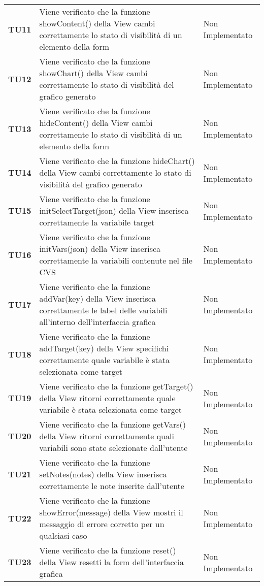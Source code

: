 \documentclass[../piano-di-qualifica.tex]{subfiles}
\begin{document}
\begin{longtable}[H]{>{\centering\bfseries}m{2.5cm} >{\centering}m{7.5cm} >{\centering\arraybackslash}m{3.5cm}}
  \textbf{TU11} & Viene verificato che la funzione showContent() della View cambi correttamente lo stato di visibilità di un elemento della form & Non Implementato \\
  \textbf{TU12} & Viene verificato che la funzione showChart() della View cambi correttamente lo stato di visibilità del grafico generato & Non Implementato \\
  \textbf{TU13} & Viene verificato che la funzione hideContent() della View cambi correttamente lo stato di visibilità di un elemento della form & Non Implementato \\
  \textbf{TU14} & Viene verificato che la funzione hideChart() della View cambi correttamente lo stato di visibilità del grafico generato & Non Implementato \\
  \textbf{TU15} & Viene verificato che la funzione initSelectTarget(json) della View inserisca correttamente la variabile target & Non Implementato \\
  \textbf{TU16} & Viene verificato che la funzione initVars(json) della View inserisca correttamente la variabili contenute nel file CVS & Non Implementato \\
  \textbf{TU17} & Viene verificato che la funzione addVar(key) della View inserisca correttamente le label delle variabili all'interno dell'interfaccia grafica & Non Implementato \\
  \textbf{TU18} & Viene verificato che la funzione addTarget(key) della View specifichi correttamente quale variabile è stata selezionata come target & Non Implementato \\
  \textbf{TU19} & Viene verificato che la funzione getTarget() della View ritorni correttamente quale variabile è stata selezionata come target & Non Implementato \\
  \textbf{TU20} & Viene verificato che la funzione getVars() della View ritorni correttamente quali variabili sono state selezionate dall'utente & Non Implementato \\
  \textbf{TU21} & Viene verificato che la funzione setNotes(notes) della View inserisca correttamente le note inserite dall'utente & Non Implementato \\
  \textbf{TU22} & Viene verificato che la funzione showError(message) della View mostri il messaggio di errore corretto per un qualsiasi caso & Non Implementato \\
  \textbf{TU23} & Viene verificato che la funzione reset() della View resetti la form dell'interfaccia grafica & Non Implementato \\

\end{longtable}
\end{document}
